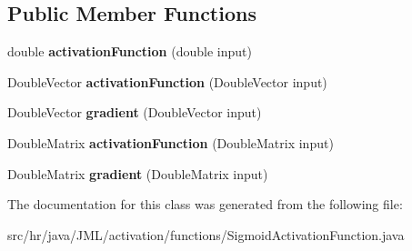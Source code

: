 \subsection*{Public Member Functions}
\begin{DoxyCompactItemize}
\item 
\hypertarget{classhr_1_1java_1_1_j_m_l_1_1activation_1_1functions_1_1_sigmoid_activation_function_a737490dc47aeb8a637f016f8e8ae8a0a}{double {\bfseries activation\+Function} (double input)}\label{classhr_1_1java_1_1_j_m_l_1_1activation_1_1functions_1_1_sigmoid_activation_function_a737490dc47aeb8a637f016f8e8ae8a0a}

\item 
\hypertarget{classhr_1_1java_1_1_j_m_l_1_1activation_1_1functions_1_1_sigmoid_activation_function_abb8ab561d75da996d1d281029a34d809}{Double\+Vector {\bfseries activation\+Function} (Double\+Vector input)}\label{classhr_1_1java_1_1_j_m_l_1_1activation_1_1functions_1_1_sigmoid_activation_function_abb8ab561d75da996d1d281029a34d809}

\item 
\hypertarget{classhr_1_1java_1_1_j_m_l_1_1activation_1_1functions_1_1_sigmoid_activation_function_a472d7e5e95aa4e20a63945b91763f3b1}{Double\+Vector {\bfseries gradient} (Double\+Vector input)}\label{classhr_1_1java_1_1_j_m_l_1_1activation_1_1functions_1_1_sigmoid_activation_function_a472d7e5e95aa4e20a63945b91763f3b1}

\item 
\hypertarget{classhr_1_1java_1_1_j_m_l_1_1activation_1_1functions_1_1_sigmoid_activation_function_a2d01df4e92c59cd0bc28343483df442e}{Double\+Matrix {\bfseries activation\+Function} (Double\+Matrix input)}\label{classhr_1_1java_1_1_j_m_l_1_1activation_1_1functions_1_1_sigmoid_activation_function_a2d01df4e92c59cd0bc28343483df442e}

\item 
\hypertarget{classhr_1_1java_1_1_j_m_l_1_1activation_1_1functions_1_1_sigmoid_activation_function_a2976de822fa53fdab12cc4b2c5299c13}{Double\+Matrix {\bfseries gradient} (Double\+Matrix input)}\label{classhr_1_1java_1_1_j_m_l_1_1activation_1_1functions_1_1_sigmoid_activation_function_a2976de822fa53fdab12cc4b2c5299c13}

\end{DoxyCompactItemize}


The documentation for this class was generated from the following file\+:\begin{DoxyCompactItemize}
\item 
src/hr/java/\+J\+M\+L/activation/functions/Sigmoid\+Activation\+Function.\+java\end{DoxyCompactItemize}
